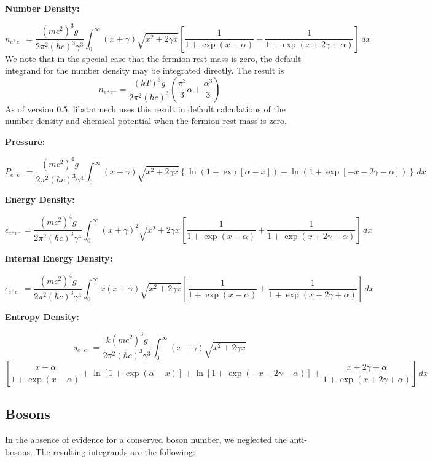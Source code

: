 \documentclass{article}    %
\begin{document}
\begin{center}
{\bf Number Density:}
\end{center}
\[
n_{e^+e^-} = \frac {(mc^2)^3g} {2\pi^2(\hbar c)^3\gamma^3}
  \int_0^{\infty} (x+\gamma)\sqrt{x^2+2\gamma x}
  \left[
    \frac{1}{1+{\exp}(x-\alpha)} -
    \frac{1}{1+{\exp}(x+2\gamma+\alpha)}
  \right]
  \, dx
\]
We note that in the special case that the fermion rest mass is zero, the
default integrand for the number density may be integrated directly.
The result is
\[
n_{e^+e^-} = \frac {(kT)^3g} {2\pi^2(\hbar c)^3}
  \left( \frac{\pi^3}{3}\alpha + \frac{\alpha^3}{3} \right )
\]
As
of version 0.5, libstatmech uses this result in default calculations of the
number density and chemical potential when the fermion rest mass is zero.
\begin{center}
{\bf Pressure:}
\end{center}
\[
P_{e^+e^-} = \frac {(mc^2)^4g} {2\pi^2(\hbar c)^3\gamma^4}
  \int_0^{\infty} (x+\gamma)\sqrt{x^2+2\gamma x}
  \left\{
    {\ln}(1+{\exp}[\alpha-x]) +
    {\ln}(1+{\exp}[-x-2\gamma-\alpha])
  \right\}
  \, dx
\]
\begin{center}
{\bf Energy Density:}
\end{center}
\[
\epsilon_{e^+e^-} = \frac {(mc^2)^4g} {2\pi^2(\hbar c)^3\gamma^4}
  \int_0^{\infty} (x+\gamma)^2\sqrt{x^2+2\gamma x}
  \left[
    \frac{1}{1+{\exp}(x-\alpha)} +
    \frac{1}{1+{\exp}(x+2\gamma+\alpha)}
  \right]
  \, dx
\]
\begin{center}
{\bf Internal Energy Density:}
\end{center}
\[
\epsilon_{e^+e^-} = \frac {(mc^2)^4g} {2\pi^2(\hbar c)^3\gamma^4}
  \int_0^{\infty} x (x+\gamma)\sqrt{x^2+2\gamma x}
  \left[
    \frac{1}{1+{\exp}(x-\alpha)} +
    \frac{1}{1+{\exp}(x+2\gamma+\alpha)}
  \right]
  \, dx
\]
\begin{center}
{\bf Entropy Density:}
\end{center}
\[
s_{e^+e^-} = \frac {k(mc^2)^3g} {2\pi^2(\hbar c)^3\gamma^3}
  \int_0^{\infty} {(x+\gamma)\sqrt{x^2+2\gamma x}}
\]
\[
\left[
    \frac{x-\alpha}{1+{\exp}(x-\alpha)} +
    {\ln}[1+{\exp}(\alpha-x)] +
    {\ln}[1+{\exp}(-x-2\gamma-\alpha)] +
    \frac{x+2\gamma+\alpha}{1+{\exp}(x+2\gamma+\alpha)}
\right]
\, dx
\]

\subsection{Bosons}

In the absence of evidence for a conserved boson number,
we neglected the anti-bosons.  The resulting integrands are the following:
\end{document}
